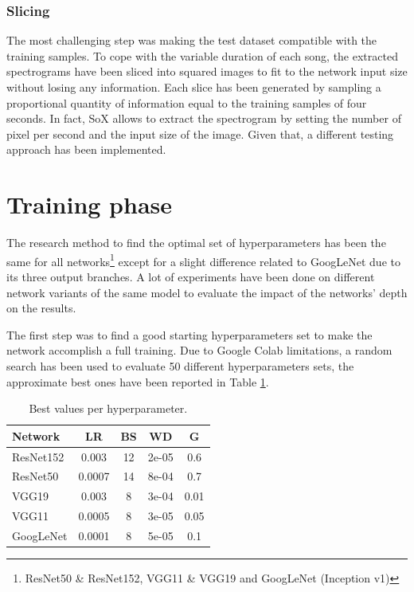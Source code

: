 \documentclass[10pt,twocolumn,letterpaper]{article}
\begin{document}
\subsubsection{Slicing}

The most challenging step was making the test dataset compatible with the training samples. To cope with the variable duration of each song, the extracted spectrograms have been sliced into squared images to fit to the network input size without losing any information. Each slice has been generated by sampling a proportional quantity of information equal to the training samples of four seconds. In fact, SoX allows to extract the spectrogram by setting the number of pixel per second and the input size of the image. Given that, a different testing approach has been implemented.

\section{Training phase}\label{training}

The research method to find the optimal set of hyperparameters has been the same for all networks\footnote {ResNet50 \& ResNet152, VGG11 \& VGG19 and GoogLeNet (Inception v1)} except for a slight difference related to GoogLeNet due to its three output branches. A lot of experiments have been done on different network variants of the same model to evaluate the impact of the networks' depth on the results.

The first step was to find a good starting hyperparameters set to make the network accomplish a full training. Due to Google Colab limitations, a random search has been used to evaluate 50 different hyperparameters sets, the approximate best ones have been reported in Table \ref{tab:sets}.

\begin{table}
   \begin{center}
      \def\arraystretch{1.5}
   \begin{tabular}{l|c|c|c|c}
   \textbf{Network} & \textbf{LR} & \textbf{BS} & \textbf{WD} & \textbf{G} \\
   \hline
   ResNet152 & 0.003 & 12 & 2e-05 & 0.6 \\
   \hline
   ResNet50 & 0.0007 & 14 & 8e-04 & 0.7 \\
   \hline
   VGG19 & 0.003 & 8 & 3e-04 & 0.01 \\
   \hline
   VGG11 & 0.0005 & 8 & 3e-05 & 0.05 \\
   \hline
   GoogLeNet & 0.0001 & 8 & 5e-05 & 0.1 \\
   \end{tabular}
   \end{center}
   \caption{Best values per hyperparameter.}
   \label{tab:sets}
   \end{table}
\end{document}
